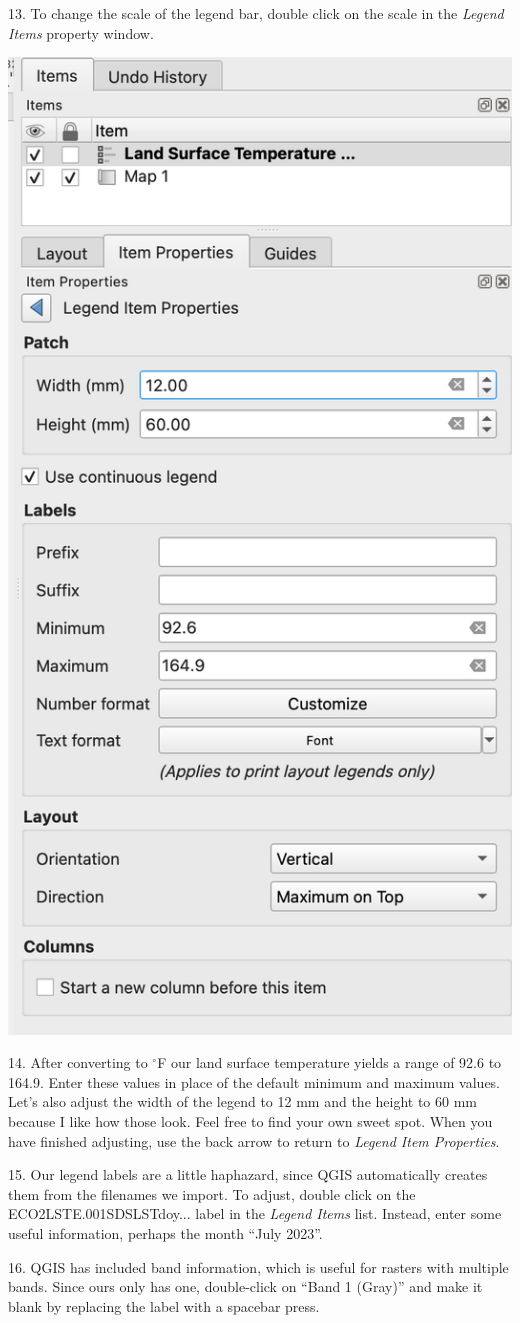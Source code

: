 \documentclass[oneside,a4paper,11pt,explicit]{book}
\begin{document}
13. To change the scale of the legend bar, double click on the scale in the \textit{Legend Items} property window.

\vspace{.25em}

\centerline{\includegraphics[width=.5\textwidth]{tempscale.png}}

14. After converting to $^{\circ}$F our land surface temperature yields a range of 92.6 to 164.9. Enter these values in place of the default minimum and maximum values. Let's also adjust the width of the legend to 12 mm and the height to 60 mm because I like how those look. Feel free to find your own sweet spot. When you have finished adjusting, use the back arrow to return to \textit{Legend Item Properties}.

15. Our legend labels are a little haphazard, since QGIS automatically creates them from the filenames we import. To adjust, double click on the ECO2LSTE.001SDSLSTdoy... label in the \textit{Legend Items} list. Instead, enter some useful information, perhaps the month ``July 2023''. 

16. QGIS has included band information, which is useful for rasters with multiple bands. Since ours only has one, double-click on ``Band 1 (Gray)'' and make it blank by replacing the label with a spacebar press.
\end{document}
